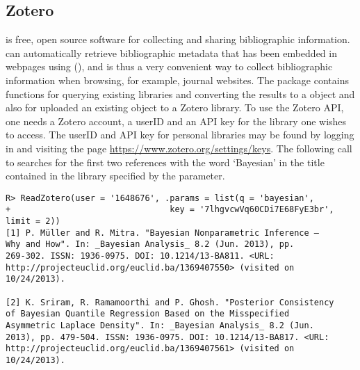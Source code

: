 \documentclass[article]{jss}\usepackage[]{graphicx}\usepackage[]{color}
\makeatletter
\newenvironment{kframe}{%
 \def\at@end@of@kframe{}%
 \ifinner\ifhmode%
  \def\at@end@of@kframe{\end{minipage}}%
  \begin{minipage}{\columnwidth}%
 \fi\fi%
 \def\FrameCommand##1{\hskip\@totalleftmargin \hskip-\fboxsep
 \colorbox{shadecolor}{##1}\hskip-\fboxsep
     \hskip-\linewidth \hskip-\@totalleftmargin \hskip\columnwidth}%
 \MakeFramed {\advance\hsize-\width
   \@totalleftmargin\z@ \linewidth\hsize
   \@setminipage}}%
 {\par\unskip\endMakeFramed%
 \at@end@of@kframe}
\newenvironment{knitrout}{}{} %
\newcommand{\ourpkg}{\pkg{RefManageR}}
\makeatother
\begin{document}
\subsection{Zotero}
 is free, open source software for collecting and sharing bibliographic information.   can automatically retrieve bibliographic metadata that has been embedded in webpages using  (), and is thus a very convenient way to collect bibliographic information when browsing, for example, journal websites.  The \ourpkg{} package contains functions for querying existing  libraries and converting the results to a  object and also for uploaded an existing  object to a Zotero library.  To use the Zotero API, one needs a Zotero account, a userID and an API key for the library one wishes to access.  The userID and API key for personal libraries may be found by logging in and visiting the page \url{https://www.zotero.org/settings/keys}.  The following call to  searches for the first two references with the word `Bayesian' in the title contained in the library specified by the  parameter.
\begin{knitrout}
\color{fgcolor}\begin{kframe}
\begin{verbatim}
R> ReadZotero(user = '1648676', .params = list(q = 'bayesian', 
+                                key = '7lhgvcwVq60CDi7E68FyE3br', limit = 2))
[1] P. Müller and R. Mitra. "Bayesian Nonparametric Inference –
Why and How". In: _Bayesian Analysis_ 8.2 (Jun. 2013), pp.
269-302. ISSN: 1936-0975. DOI: 10.1214/13-BA811. <URL:
http://projecteuclid.org/euclid.ba/1369407550> (visited on
10/24/2013).

[2] K. Sriram, R. Ramamoorthi and P. Ghosh. "Posterior Consistency
of Bayesian Quantile Regression Based on the Misspecified
Asymmetric Laplace Density". In: _Bayesian Analysis_ 8.2 (Jun.
2013), pp. 479-504. ISSN: 1936-0975. DOI: 10.1214/13-BA817. <URL:
http://projecteuclid.org/euclid.ba/1369407561> (visited on
10/24/2013).
\end{verbatim}
\end{kframe}
\end{knitrout}
\end{document}

